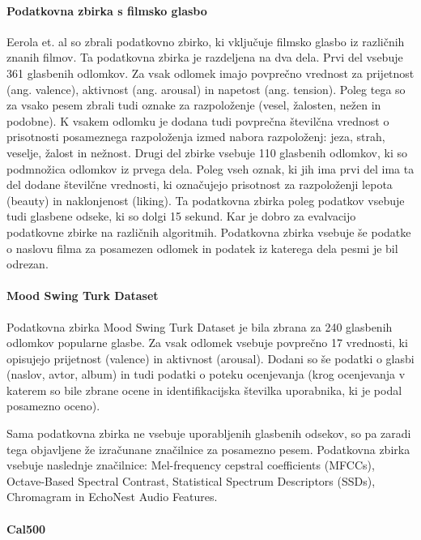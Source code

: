 \documentclass[a4paper, 12pt]{book}
\begin{document}
{\paragraph{Podatkovna zbirka s filmsko glasbo}

Eerola et. al \cite{eerola2010comparison} so zbrali podatkovno zbirko, ki vključuje filmsko glasbo iz različnih znanih filmov. Ta podatkovna zbirka je razdeljena na dva dela. Prvi del vsebuje 361 glasbenih odlomkov. Za vsak odlomek imajo povprečno vrednost za prijetnost (ang. valence), aktivnost (ang. arousal) in  napetost (ang. tension). Poleg tega so za vsako pesem zbrali tudi oznake za razpoloženje (vesel, žalosten, nežen in podobne). K vsakem odlomku je dodana tudi povprečna številčna vrednost o prisotnosti posameznega razpoloženja izmed nabora razpoloženj: jeza, strah, veselje, žalost in nežnost. Drugi del zbirke vsebuje 110 glasbenih odlomkov, ki so podmnožica odlomkov iz prvega dela. Poleg vseh oznak, ki jih ima prvi del ima ta del dodane številčne vrednosti, ki označujejo prisotnost za razpoloženji lepota (beauty) in naklonjenost (liking). Ta podatkovna zbirka poleg podatkov vsebuje tudi glasbene odseke, ki so dolgi 15 sekund. Kar je dobro za evalvacijo podatkovne zbirke na različnih algoritmih. Podatkovna zbirka vsebuje še podatke o naslovu filma za posamezen odlomek in podatek iz katerega dela pesmi je bil odrezan. 

\paragraph{Mood Swing Turk Dataset}

Podatkovna zbirka Mood Swing Turk Dataset \cite{schmidt2011modeling} je bila zbrana za 240 glasbenih odlomkov popularne glasbe. Za vsak odlomek vsebuje povprečno 17 vrednosti, ki opisujejo prijetnost (valence) in aktivnost (arousal). Dodani so še podatki o glasbi (naslov, avtor, album) in tudi podatki o poteku ocenjevanja (krog ocenjevanja v katerem so bile zbrane ocene in identifikacijska številka uporabnika, ki je podal posamezno oceno). 

Sama podatkovna zbirka ne vsebuje uporabljenih glasbenih odsekov, so pa zaradi tega objavljene že izračunane značilnice za posamezno pesem. Podatkovna zbirka vsebuje naslednje značilnice: Mel-frequency cepstral coefficients (MFCCs), Octave-Based Spectral Contrast, Statistical Spectrum Descriptors (SSDs), Chromagram in EchoNest Audio Features.

\paragraph{Cal500}

}
\end{document}

